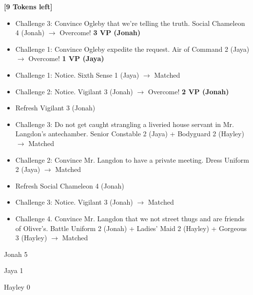 \textbf{{[}9 Tokens left{]}}





\begin{itemize}[noitemsep,topsep=0pt]
\item Challenge 3: Convince Ogleby that we're telling the truth. Social Chameleon 4 (Jonah) $\rightarrow$ Overcome! \textbf{3 VP (Jonah)}
\item Challenge 1: Convince Ogleby expedite the request. Air of Command 2 (Jaya) $\rightarrow$ Overcome! \textbf{1 VP (Jaya)}
\item Challenge 1: Notice. Sixth Sense 1 (Jaya) $\rightarrow$ Matched
\item Challenge 2: Notice. Vigilant 3 (Jonah) $\rightarrow$ Overcome! \textbf{2 VP (Jonah)}
\item Refresh Vigilant 3 (Jonah)
\item Challenge 3: Do not get caught strangling a liveried house servant in Mr. Langdon's antechamber. Senior Constable 2 (Jaya) + Bodyguard 2 (Hayley) $\rightarrow$ Matched
\item Challenge 2: Convince Mr. Langdon to have a private meeting. Dress Uniform 2 (Jaya) $\rightarrow$ Matched
\item Refresh Social Chameleon 4 (Jonah)
\item Challenge 3: Notice. Vigilant 3 (Jonah) $\rightarrow$ Matched
\item Challenge 4.  Convince Mr. Langdon that we not street thugs and are friends of Oliver's.  Battle Uniform 2 (Jonah) + Ladies' Maid 2 (Hayley) + Gorgeous 3 (Hayley)  $\rightarrow$ Matched
\end{itemize}



{\parskip=0pt
Jonah 5

Jaya 1

Hayley 0
}


